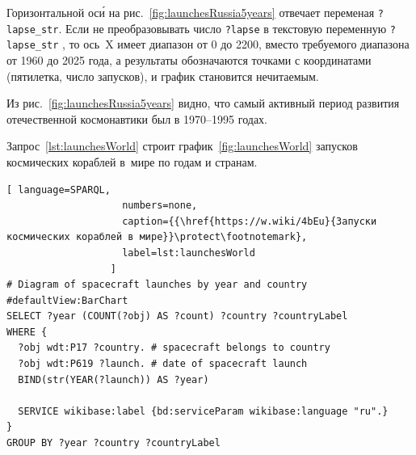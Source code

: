 Горизонтальной ос\'{и} на рис.~\ref{fig:launchesRussia5years} отвечает переменая \mbox{\lstinline|?lapse_str|.} 
Если не преобразовывать число \lstinline|?lapse| 
в текстовую переменную \mbox{\lstinline|?lapse_str|}%
, то ось~X имеет диапазон от 0 до 2200, 
вместо требуемого диапазона от 1960 до 2025 года, 
а результаты обозначаются точками с координатами (пятилетка, число запусков), 
и график становится нечитаемым. 

Из рис.~\ref{fig:launchesRussia5years} видно, 
что самый активный период развития отечественной космонавтики был в 1970--1995 годах.

Запрос~\ref{lst:launchesWorld} строит график~\ref{fig:launchesWorld} 
запусков космических кораблей в~мире по годам и странам.

\begin{lstlisting}[ language=SPARQL, 
                    numbers=none, 
                    caption={{\href{https://w.wiki/4bEu}{Запуски космических кораблей в мире}}\protect\footnotemark}, 
                    label=lst:launchesWorld 
                  ]
# Diagram of spacecraft launches by year and country
#defaultView:BarChart
SELECT ?year (COUNT(?obj) AS ?count) ?country ?countryLabel
WHERE {
  ?obj wdt:P17 ?country. # spacecraft belongs to country 
  ?obj wdt:P619 ?launch. # date of spacecraft launch
  BIND(str(YEAR(?launch)) AS ?year)
  
  SERVICE wikibase:label {bd:serviceParam wikibase:language "ru".}
}
GROUP BY ?year ?country ?countryLabel
\end{lstlisting}
\label{question:spacecraft_2}

